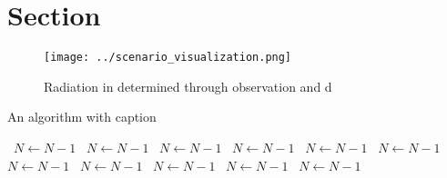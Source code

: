 \documentclass[a4paper]{article}
\begin{document}
\section{Section}

\begin{figure}
\centering
\texttt{[image: ../scenario\_visualization.png]}
\caption{Radiation in determined through observation and d
}
\end{figure}
 
\begin{algorithm}
\caption{An algorithm with caption}
\begin{algorithmic}
\    \State $N \gets N - 1$
\    \State $N \gets N - 1$
\    \State $N \gets N - 1$
\    \State $N \gets N - 1$
\    \State $N \gets N - 1$
\    \State $N \gets N - 1$
\    \State $N \gets N - 1$
\    \State $N \gets N - 1$
\    \State $N \gets N - 1$
\    \State $N \gets N - 1$
\    \State $N \gets N - 1$
\EndWhile
\end{algorithmic}
\end{algorithm}
\end{document}
